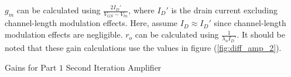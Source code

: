 $g_{m}$ can be calculated using $\frac{ 2 I_{D}' }{ V_{GS} - V_{tn} }$, where $I_{D}'$ is the drain current excluding channel-length modulation effects.
Here, assume $I_{D} \approx I_{D}'$ since channel-length modulation effects are negligible.
$r_{o}$ can be calculated using $\frac{1}{\lambda _{n} I_{D}' }$.
It should be noted that these gain calculations use the values in figure (\ref{fig:diff_amp_2}).

\FloatBarrier

\begin{table}[h!]
	\centering
	\caption{Gains for Part $1$ Second Iteration Amplifier}
	\label{tab:sim1_gain}
\end{table}

\FloatBarrier
